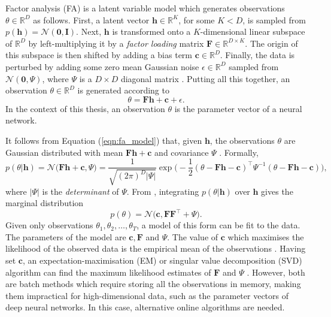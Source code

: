 \documentclass[msc,deptreport.inf]{infthesis} %
\newcommand{\matr}[1]{\mathbf{#1}}
\newcommand{\R}{\mathbb R}
\begin{document}
Factor analysis (FA) is a latent variable model which generates observations $\theta \in \R^D$ as follows. First, a latent vector $\matr{h} \in \R^K$, for some $K < D$, is sampled from $p(\matr{h}) = \mathcal{N}(\matr{0}, \matr{I})$. Next, $\matr{h}$ is transformed onto a $K$-dimensional linear subspace of $\R^D$ by left-multiplying it by a \emph{factor loading} matrix $\matr{F} \in \R^{D \times K}$. The origin of this subspace is then shifted by adding a bias term $\matr{c} \in \R^D$. Finally, the data is perturbed by adding some zero mean Gaussian noise $\epsilon \in \R^D$ sampled from $\mathcal{N}(\matr{0}, \Psi)$, where $\Psi$ is a $D\times D$ diagonal matrix \cite{barber2007}. Putting all this together, an observation $\theta \in \R^D$ is generated according to 
\begin{equation}\label{eqn:fa_model}
	\theta = \matr{Fh} + \matr{c} + \epsilon.
\end{equation}
In the context of this thesis, an observation $\theta$ is the parameter vector of a neural network. 

It follows from Equation (\ref{eqn:fa_model}) that, given $\matr{h}$, the observations $\theta$ are Gaussian distributed with mean $\matr{Fh} + \matr{c}$ and covariance $\Psi$ \cite{barber2007}. Formally,
\begin{equation}\label{eqn:fa_cond_dist}
	p(\theta | \matr{h}) 
	= \mathcal{N}\big( \matr{Fh} + \matr{c}, \Psi \big)
	= \frac{1}{\sqrt{(2\pi)^D |\Psi|}} 
	\exp \Big(-\frac{1}{2} (\theta - \matr{Fh} - \matr{c})^\intercal \Psi^{-1} (\theta - \matr{Fh} - \matr{c})\Big),
\end{equation}
where $|\Psi|$ is the \emph{determinant} of $\Psi$. From \cite{barber2007}, integrating $p(\theta | \matr{h})$ over $\matr{h}$ gives the marginal distribution
\begin{equation}\label{eqn:fa_marginal_dist}
	p(\theta) = \mathcal{N}\big(\matr{c}, \matr{FF}^{\intercal} + \Psi\big).
\end{equation}
Given only observations $\theta_1, \theta_2, \dots, \theta_T$, a model of this form can be fit to the data. The parameters of the model are $\matr{c}, \matr{F}$ and $\Psi$. The value of $\matr{c}$ which maximises the likelihood of the observed data is the empirical mean of the observations \cite{barber2007}. Having set $\matr{c}$, an expectation-maximisation (EM) or singular value decomposition (SVD) algorithm can find the maximum likelihood estimates of $\matr{F}$ and $\Psi$ \cite{barber2007}. However, both are batch methods which require storing all the observations in memory, making them impractical for high-dimensional data, such as the parameter vectors of deep neural networks. In this case, alternative online algorithms are needed.  
\end{document}
